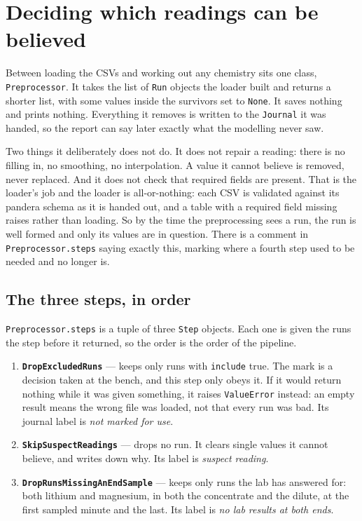 \section{Deciding which readings can be believed}

Between loading the CSVs and working out any chemistry sits one class, \texttt{Preprocessor}.
It takes the list of \texttt{Run} objects the loader built and returns a shorter list, with
some values inside the survivors set to \texttt{None}. It saves nothing and prints nothing.
Everything it removes is written to the \texttt{Journal} it was handed, so the report can say
later exactly what the modelling never saw.

Two things it deliberately does not do. It does not repair a reading: there is no filling in,
no smoothing, no interpolation. A value it cannot believe is removed, never replaced. And it
does not check that required fields are present. That is the loader's job and the loader is
all-or-nothing: each CSV is validated against its pandera schema as it is handed out, and a
table with a required field missing raises rather than loading. So by the time the
preprocessing sees a run, the run is well formed and only its values are in question. There is
a comment in \texttt{Preprocessor.steps} saying exactly this, marking where a fourth step used
to be needed and no longer is.

\subsection{The three steps, in order}

\texttt{Preprocessor.steps} is a tuple of three \texttt{Step} objects. Each one is given the
runs the step before it returned, so the order is the order of the pipeline.

\begin{enumerate}[nosep]
  \item \textbf{\texttt{DropExcludedRuns}} --- keeps only runs with \texttt{include} true.
        The mark is a decision taken at the bench, and this step only obeys it. If it would
        return nothing while it was given something, it raises \texttt{ValueError} instead:
        an empty result means the wrong file was loaded, not that every run was bad. Its
        journal label is \emph{not marked for use}.
  \item \textbf{\texttt{SkipSuspectReadings}} --- drops no run. It clears single values it
        cannot believe, and writes down why. Its label is \emph{suspect reading}.
  \item \textbf{\texttt{DropRunsMissingAnEndSample}} --- keeps only runs the lab has answered
        for: both lithium and magnesium, in both the concentrate and the dilute, at the
        first sampled minute and the last. Its label is \emph{no lab results at both ends}.
\end{enumerate}

